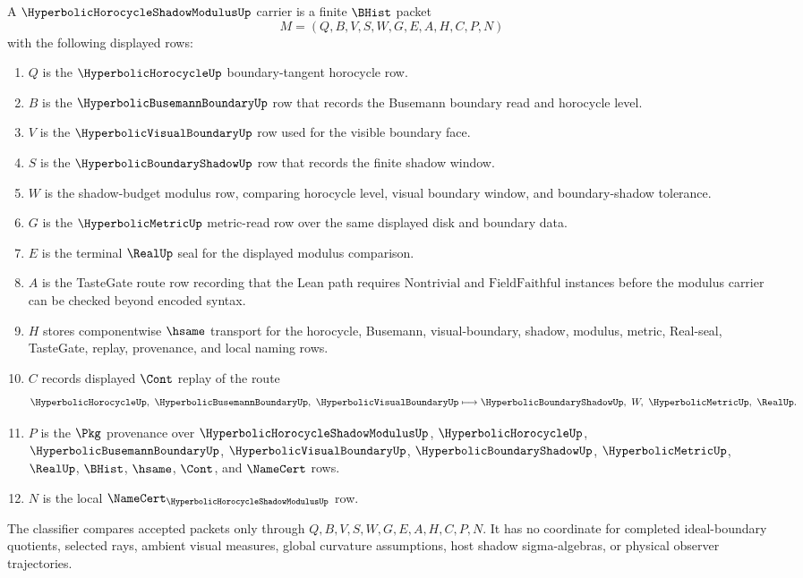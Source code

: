 \begin{definition}
\label{def:hyperbolic-horocycle-shadow-modulus-carrier}
A $\HyperbolicHorocycleShadowModulusUp$ carrier is a finite $\BHist$ packet
$$
M=(Q,B,V,S,W,G,E,A,H,C,P,N)
$$
with the following displayed rows:
\begin{enumerate}
\item $Q$ is the $\HyperbolicHorocycleUp$ boundary-tangent horocycle row.
\item $B$ is the $\HyperbolicBusemannBoundaryUp$ row that records the Busemann boundary read and horocycle level.
\item $V$ is the $\HyperbolicVisualBoundaryUp$ row used for the visible boundary face.
\item $S$ is the $\HyperbolicBoundaryShadowUp$ row that records the finite shadow window.
\item $W$ is the shadow-budget modulus row, comparing horocycle level, visual boundary window, and boundary-shadow tolerance.
\item $G$ is the $\HyperbolicMetricUp$ metric-read row over the same displayed disk and boundary data.
\item $E$ is the terminal $\RealUp$ seal for the displayed modulus comparison.
\item $A$ is the TasteGate route row recording that the Lean path requires $\mathrm{Nontrivial}$ and $\mathrm{FieldFaithful}$ instances before the modulus carrier can be checked beyond encoded syntax.
\item $H$ stores componentwise $\hsame$ transport for the horocycle, Busemann, visual-boundary, shadow, modulus, metric, Real-seal, TasteGate, replay, provenance, and local naming rows.
\item $C$ records displayed $\Cont$ replay of the route
$$
\HyperbolicHorocycleUp,\ \HyperbolicBusemannBoundaryUp,\ \HyperbolicVisualBoundaryUp
\longmapsto
\HyperbolicBoundaryShadowUp,\ W,\ \HyperbolicMetricUp,\ \RealUp .
$$
\item $P$ is the $\Pkg$ provenance over $\HyperbolicHorocycleShadowModulusUp$, $\HyperbolicHorocycleUp$, $\HyperbolicBusemannBoundaryUp$, $\HyperbolicVisualBoundaryUp$, $\HyperbolicBoundaryShadowUp$, $\HyperbolicMetricUp$, $\RealUp$, $\BHist$, $\hsame$, $\Cont$, and $\NameCert$ rows.
\item $N$ is the local $\NameCert_{\HyperbolicHorocycleShadowModulusUp}$ row.
\end{enumerate}
The classifier compares accepted packets only through $Q,B,V,S,W,G,E,A,H,C,P,N$. It has no coordinate for completed ideal-boundary quotients, selected rays, ambient visual measures, global curvature assumptions, host shadow sigma-algebras, or physical observer trajectories.
\end{definition}

